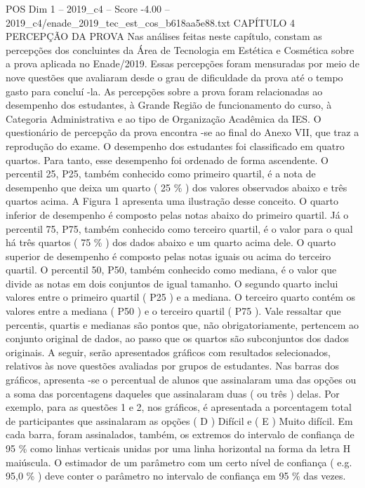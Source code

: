 \begin{textsample}{POS Dim 1 – 2019\_c4 – Score -4.00 – 2019\_c4/enade\_2019\_tec\_est\_cos\_b618aa5e88.txt}  \label{ex:f1_pos_345}
CAPÍTULO 4 PERCEPÇÃO DA PROVA Nas análises feitas neste capítulo, constam as percepções dos concluintes da Área de Tecnologia em Estética e Cosmética sobre a prova aplicada no Enade/2019.
Essas percepções foram mensuradas por meio de nove questões que avaliaram desde o grau de dificuldade da prova até o tempo gasto para concluí -la.
As percepções sobre a prova foram relacionadas ao desempenho dos estudantes, à Grande Região de funcionamento do curso, à Categoria Administrativa e ao tipo de Organização Acadêmica da IES.
O questionário de percepção da prova encontra -se ao final do Anexo VII, que traz a reprodução do exame.
O desempenho dos estudantes foi classificado em quatro quartos.
Para tanto, esse desempenho foi ordenado de forma ascendente.
O percentil 25, P25, também conhecido como primeiro quartil, é a nota de desempenho que deixa um quarto ( 25 \% ) dos valores observados abaixo e três quartos acima.
A Figura 1 apresenta uma ilustração desse conceito.
O quarto inferior de desempenho é composto pelas notas abaixo do primeiro quartil.
Já o percentil 75, P75, também conhecido como terceiro quartil, é o valor para o qual há três quartos ( 75 \% ) dos dados abaixo e um quarto acima dele.
O quarto superior de desempenho é composto pelas notas iguais ou acima do terceiro quartil.
O percentil 50, P50, também conhecido como mediana, é o valor que divide as notas em dois conjuntos de igual tamanho.
O segundo quarto inclui valores entre o primeiro quartil ( P25 ) e a mediana.
O terceiro quarto contém os valores entre a mediana ( P50 ) e o terceiro quartil ( P75 ).
Vale ressaltar que percentis, quartis e medianas são pontos que, não obrigatoriamente, pertencem ao conjunto original de dados, ao passo que os quartos são subconjuntos dos dados originais.
A seguir, serão apresentados gráficos com resultados selecionados, relativos às nove questões avaliadas por grupos de estudantes.
Nas barras dos gráficos, apresenta -se o percentual de alunos que assinalaram uma das opções ou a soma das porcentagens daqueles que assinalaram duas ( ou três ) delas.
Por exemplo, para as questões 1 e 2, nos gráficos, é apresentada a porcentagem total de participantes que assinalaram as opções ( D ) Difícil e ( E ) Muito difícil.
Em cada barra, foram assinalados, também, os extremos do intervalo de confiança de 95 \% como linhas verticais unidas por uma linha horizontal na forma da letra H maiúscula.
O estimador de um parâmetro com um certo nível de confiança ( e.g. 95,0 \% ) deve conter o parâmetro no intervalo de confiança em 95 \% das vezes.

\end{textsample}
